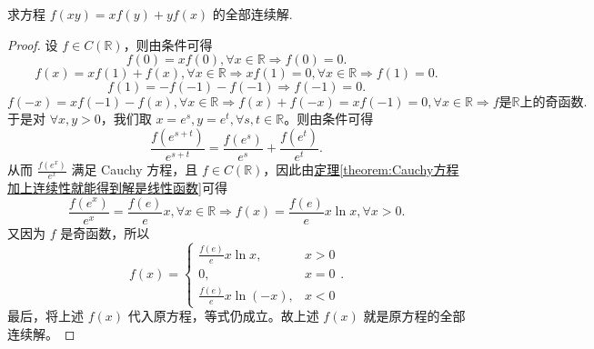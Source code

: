 \documentclass[../../main.tex]{subfiles}%
\begin{document}
\begin{example}
求方程 \(f(xy)=xf(y)+yf(x)\) 的全部连续解.
\end{example}
\begin{proof}
设 \(f\in C(\mathbb{R})\)，则由条件可得
\[
f(0)=xf(0),\forall x\in \mathbb{R}\Rightarrow f(0)=0.
\]
\[
f(x)=xf(1)+f(x),\forall x\in \mathbb{R}\Rightarrow xf(1)=0,\forall x\in \mathbb{R}\Rightarrow f(1)=0.
\]
\[
f(1)=-f(-1)-f(-1)\Rightarrow f(-1)=0.
\]
\[
f(-x)=xf(-1)-f(x),\forall x\in \mathbb{R}\Rightarrow f(x)+f(-x)=xf(-1)=0,\forall x\in \mathbb{R}
\Rightarrow f\text{是}\mathbb{R}\text{上的奇函数}.
\]
于是对 \(\forall x,y > 0\)，我们取 \(x = e^s,y = e^t,\forall s,t\in \mathbb{R}\)。则由条件可得
\[
\frac{f(e^{s + t})}{e^{s + t}}=\frac{f(e^s)}{e^s}+\frac{f(e^t)}{e^t}.
\]
从而 \(\frac{f(e^x)}{e^x}\) 满足 Cauchy 方程，且 \(f\in C(\mathbb{R})\)，因此由\hyperref[theorem:Cauchy方程加上连续性就能得到解是线性函数]{定理\ref{theorem:Cauchy方程加上连续性就能得到解是线性函数}}可得
\[
\frac{f(e^x)}{e^x}=\frac{f(e)}{e}x,\forall x\in \mathbb{R}\Rightarrow f(x)=\frac{f(e)}{e}x\ln x,\forall x > 0.
\]
又因为 \(f\) 是奇函数，所以
\[
f(x)=\begin{cases}
\frac{f(e)}{e}x\ln x, & x > 0\\
0, & x = 0\\
\frac{f(e)}{e}x\ln(-x), & x < 0
\end{cases}.
\]
最后，将上述 \(f(x)\) 代入原方程，等式仍成立。故上述 \(f(x)\) 就是原方程的全部连续解。
\end{proof}
\end{document}
